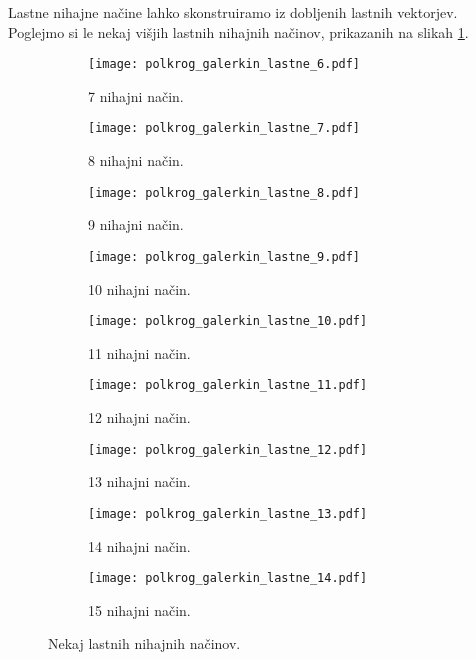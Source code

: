 \documentclass[12pt,a4paper]{article}
\begin{document}
Lastne nihajne načine lahko skonstruiramo iz dobljenih lastnih vektorjev. Poglejmo si le nekaj višjih lastnih nihajnih načinov, prikazanih na slikah \ref{fig:slika12}.

\begin{figure}[H]
    \centering
    \begin{subfigure}[b]{0.3\textwidth}  			
        \texttt{[image: polkrog\_galerkin\_lastne\_6.pdf]}
        \caption{7 nihajni način.}
    \end{subfigure}
    \begin{subfigure}[b]{0.3\textwidth}  			
        \texttt{[image: polkrog\_galerkin\_lastne\_7.pdf]}
        \caption{8 nihajni način.}
    \end{subfigure}
        \begin{subfigure}[b]{0.3\textwidth}  			
        \texttt{[image: polkrog\_galerkin\_lastne\_8.pdf]}
        \caption{9 nihajni način.}
    \end{subfigure}
    
        \begin{subfigure}[b]{0.3\textwidth}  			
        \texttt{[image: polkrog\_galerkin\_lastne\_9.pdf]}
        \caption{10 nihajni način.}
    \end{subfigure}
        \begin{subfigure}[b]{0.3\textwidth}  			
        \texttt{[image: polkrog\_galerkin\_lastne\_10.pdf]}
        \caption{11 nihajni način.}
    \end{subfigure}
    \begin{subfigure}[b]{0.3\textwidth}  			
        \texttt{[image: polkrog\_galerkin\_lastne\_11.pdf]}
        \caption{12 nihajni način.}
    \end{subfigure}
    
    \begin{subfigure}[b]{0.3\textwidth}  			
        \texttt{[image: polkrog\_galerkin\_lastne\_12.pdf]}
        \caption{13 nihajni način.}
    \end{subfigure}
        \begin{subfigure}[b]{0.3\textwidth}  			
        \texttt{[image: polkrog\_galerkin\_lastne\_13.pdf]}
        \caption{14 nihajni način.}
    \end{subfigure}
    \begin{subfigure}[b]{0.3\textwidth}  			
        \texttt{[image: polkrog\_galerkin\_lastne\_14.pdf]}
        \caption{15 nihajni način.}
    \end{subfigure}
    \caption{Nekaj lastnih nihajnih načinov.} \label{fig:slika12}
\end{figure}
\end{document}
